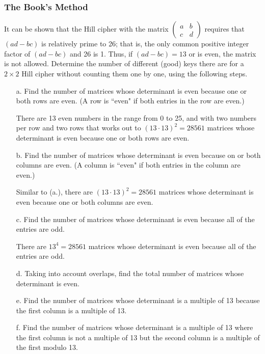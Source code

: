 \documentclass[12pt]{article}
\begin{document}
\subsubsection*{The Book's Method}
It can be shown that the Hill cipher with the matrix $\left(\begin{matrix} a & b \\ c & d\end{matrix}\right)$ requires that $\left(ad - bc\right)$ is relatively prime to 26; that is, the only common positive integer factor of $\left(ad - bc\right)$ and 26 is 1. Thus, if $\left(ad - bc\right) = 13$ or is even, the matrix is not allowed. Determine the number of different (good) keys there are for a $2 \times 2$ Hill cipher without counting them one by one, using the following steps.
\begin{itemize}
\item[a.] Find the number of matrices whose determinant is even because one or both rows are even. (A row is ``even" if both entries in the row are even.)

There are 13 even numbers in the range from 0 to 25, and with two numbers per row and two rows that works out to $\left(13 \cdot 13\right)^2 = 28561$ matrices whose determinant is even because one or both rows are even.

\item[b.] Find the number of matrices whose determinant is even because on or both columns are even. (A column is ``even" if both entries in the column are even.)

Similar to (a.), there are $\left(13 \cdot 13\right)^2 = 28561$ matrices whose determinant is even because one or both columns are even.

\item[c.] Find the number of matrices whose determinant is even because all of the entries are odd.

There are $13^4 = 28561$ matrices whose determinant is even because all of the entries are odd.

\item[d.] Taking into account overlaps, find the total number of matrices whose determinant is even.

\item[e.] Find the number of matrices whose determinant is a multiple of 13 because the first column is a multiple of 13.

\item[f.] Find the number of matrices whose determinant is a multiple of 13 where the first column is not a multiple of 13 but the second column is a multiple of the first modulo 13.


\end{itemize}
\end{document}
